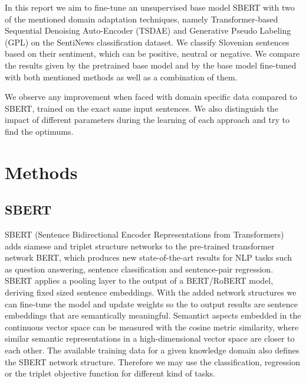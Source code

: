 \documentclass[fleqn,moreauthors,10pt]{ds_report}
\begin{document}
In this report we aim to fine-tune an unsupervised base model SBERT with two of the mentioned domain adaptation techniques, namely Transformer-based Sequential Denoising Auto-Encoder (TSDAE)  and Generative Pseudo Labeling (GPL) on the SentiNews classification dataset. We classify Slovenian sentences based on their sentiment, which can be positive, neutral or negative. We compare the results given by the pretrained base model and by the base model fine-tuned with both mentioned methods as well as a combination of them. 

We observe any improvement when faced with domain specific data compared to SBERT, trained on the exact same input sentences. We also distinguish the impact of different parameters during the learning of each approach and try to find the optimums.




\section*{Methods}

\subsection*{SBERT}
SBERT (Sentence Bidirectional Encoder Representations from Transformers) adds siamese and triplet structure networks to the pre-trained transformer network BERT, which produces new state-of-the-art results for NLP tasks such as question answering, sentence classification and sentence-pair regression. SBERT applies a pooling layer to the output of a BERT/RoBERT model, deriving fixed sized sentence embeddings. With the added network structures we can fine-tune the model and update weights so the to output results are sentence embeddings that are semantically meaningful. Semantict aspects embedded in the continuous vector space can be measured with the cosine metric similarity, where similar semantic representations in a high-dimensional vector space are closer to each other. The available training data for a given knowledge domain also defines the SBERT network structure. Therefore we may use the classification, regression or the triplet objective function for different kind of tasks.
\end{document}
